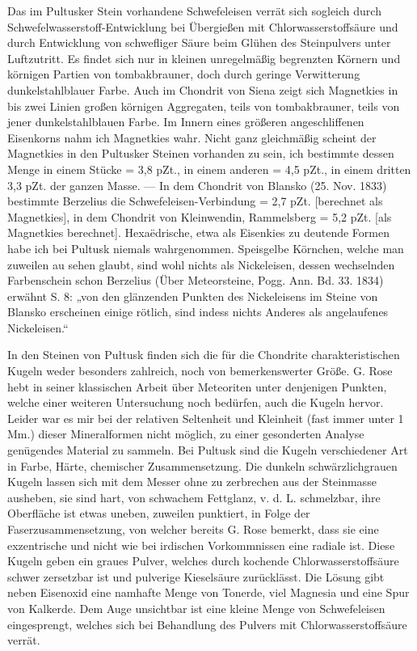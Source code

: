 \documentclass[a4paper, 11pt, oneside, german]{article}
\begin{document}
Das im Pultusker Stein vorhandene Schwefeleisen verrät sich sogleich durch Schwefelwasserstoff-Entwicklung bei Übergießen mit Chlorwasserstoffsäure und durch Entwicklung von schwefliger Säure beim Glühen des Steinpulvers unter Luftzutritt. Es findet sich nur in kleinen unregelmäßig begrenzten Körnern und körnigen Partien von tombakbrauner, doch durch geringe Verwitterung dunkelstahlblauer Farbe. Auch im Chondrit von Siena zeigt sich Magnetkies in bis zwei Linien großen körnigen Aggregaten, teils von tombakbrauner, teils von jener dunkelstahlblauen Farbe. Im Innern eines größeren angeschliffenen Eisenkorns nahm ich Magnetkies wahr. Nicht ganz gleichmäßig scheint der Magnetkies in den Pultusker Steinen vorhanden zu sein, ich bestimmte dessen Menge in einem Stücke = 3,8 pZt., in einem anderen = 4,5 pZt., in einem dritten 3,3 pZt. der ganzen Masse. --- In dem Chondrit von Blansko (25. Nov. 1833) bestimmte Berzelius die Schwefeleisen-Verbindung = 2,7 pZt. [berechnet als Magnetkies], in dem Chondrit von Kleinwendin, Rammelsberg = 5,2 pZt. [als Magnetkies berechnet]. Hexaëdrische, etwa als Eisenkies zu deutende Formen habe ich bei Pultusk niemals wahrgenommen. Speisgelbe Körnchen, welche man zuweilen au sehen glaubt, sind wohl nichts als Nickeleisen, dessen wechselnden Farbenschein schon Berzelius (Über Meteorsteine, Pogg. Ann. Bd. 33. 1834) erwähnt S. 8: „von den glänzenden Punkten des Nickeleisens im Steine von Blansko erscheinen einige rötlich, sind indess nichts Anderes als angelaufenes Nickeleisen.“

In den Steinen von Pułtusk finden sich die für die Chondrite charakteristischen Kugeln weder besonders zahlreich, noch von bemerkenswerter Größe. G. Rose hebt in seiner klassischen Arbeit über Meteoriten unter denjenigen Punkten, welche einer weiteren Untersuchung noch bedürfen, auch die Kugeln hervor. Leider war es mir bei der relativen Seltenheit und Kleinheit (fast immer unter 1 Mm.) dieser Mineralformen nicht möglich, zu einer gesonderten Analyse genügendes Material zu sammeln. Bei Pultusk sind die Kugeln verschiedener Art in Farbe, Härte, chemischer Zusammensetzung. Die dunkeln schwärzlichgrauen Kugeln lassen sich mit dem Messer ohne zu zerbrechen aus der Steinmasse ausheben, sie sind hart, von schwachem Fettglanz, v. d. L. schmelzbar, ihre Oberfläche ist etwas uneben, zuweilen punktiert, in Folge der Faserzusammensetzung, von welcher bereits G. Rose bemerkt, dass sie eine exzentrische und nicht wie bei irdischen Vorkommnissen eine radiale ist. Diese Kugeln geben ein graues Pulver, welches durch kochende Chlorwasserstoffsäure schwer zersetzbar ist und pulverige Kieselsäure zurücklässt. Die Lösung gibt neben Eisenoxid eine namhafte Menge von Tonerde, viel Magnesia und eine Spur von Kalkerde. Dem Auge unsichtbar ist eine kleine Menge von Schwefeleisen eingesprengt, welches sich bei Behandlung des Pulvers mit Chlorwasserstoffsäure verrät.
\end{document}
